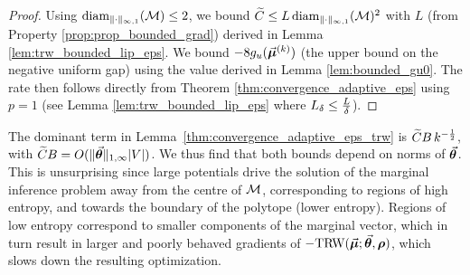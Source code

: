 \begin{proof}
	Using $\operatorname{diam}_{\|\cdot \|_{\infty,1}}(\mathcal{M}) \leq 2$,
	we bound $\widetilde{C}\leq L\operatorname{diam}_{\|\cdot \|_{\infty,1}}(\mathcal{M})^2$ with $L$ (from Property \ref{prop:prop_bounded_grad}) derived in Lemma \ref{lem:trw_bounded_lip_eps}. 
	We bound $-8g_u(\vec{\bm{\mu}}^{(k)})$ (the upper bound on the negative uniform gap) using the value derived in Lemma \ref{lem:bounded_gu0}.
	The rate then follows directly from Theorem \ref{thm:convergence_adaptive_eps} using $p=1$ (see Lemma \ref{lem:trw_bounded_lip_eps} where $L_\delta \leq \frac{L}{\delta}$).
\end{proof}
The dominant term in Lemma~\ref{thm:convergence_adaptive_eps_trw} is $\widetilde{C} B \, k^{-\frac{1}{2}}$, with $\widetilde{C} B  = O( \|\vec{\bm{\theta}} \|_{1, \infty} |V|)$.
We thus find that both bounds depend on norms of $\vec{\bm{\theta}}$. This is unsurprising since large potentials
drive the solution of the marginal inference problem away from the centre of $\mathcal{M}$, corresponding to regions of high entropy,
and towards the boundary of the polytope (lower entropy). Regions of low entropy correspond to smaller components
of the marginal vector, which in turn result in larger and poorly behaved gradients of $-\text{TRW}(\vec{\bm{\mu}};\vec{\bm{\theta}},\bm{\rho})$, which slows down the resulting optimization. 
